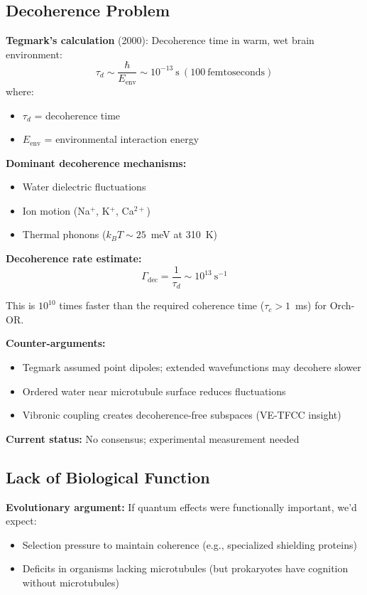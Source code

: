 \subsection{Decoherence Problem}

\textbf{Tegmark's calculation} (2000): Decoherence time in warm, wet brain environment:
\begin{equation}
\tau_d \sim \frac{\hbar}{E_{\mathrm{env}}} \sim 10^{-13}\ \mathrm{s}\ (100\ \mathrm{femtoseconds})
\end{equation}
where:
\begin{itemize}
\item $\tau_d$ = decoherence time
\item $E_{\mathrm{env}}$ = environmental interaction energy
\end{itemize}

\textbf{Dominant decoherence mechanisms:}
\begin{itemize}
\item Water dielectric fluctuations
\item Ion motion (Na$^+$, K$^+$, Ca$^{2+}$)
\item Thermal phonons ($k_B T \sim 25$~meV at 310~K)
\end{itemize}

\textbf{Decoherence rate estimate:}
\begin{equation}
\Gamma_{\mathrm{dec}} = \frac{1}{\tau_d} \sim 10^{13}\ \mathrm{s}^{-1}
\end{equation}

This is $10^{10}$ times faster than the required coherence time ($\tau_c > 1$~ms) for Orch-OR.

\textbf{Counter-arguments:}
\begin{itemize}
\item Tegmark assumed point dipoles; extended wavefunctions may decohere slower
\item Ordered water near microtubule surface reduces fluctuations
\item Vibronic coupling creates decoherence-free subspaces (VE-TFCC insight)
\end{itemize}

\textbf{Current status:} No consensus; experimental measurement needed

\subsection{Lack of Biological Function}

\textbf{Evolutionary argument:} If quantum effects were functionally important, we'd expect:
\begin{itemize}
\item Selection pressure to maintain coherence (e.g., specialized shielding proteins)
\item Deficits in organisms lacking microtubules (but prokaryotes have cognition without microtubules)
\end{itemize}

